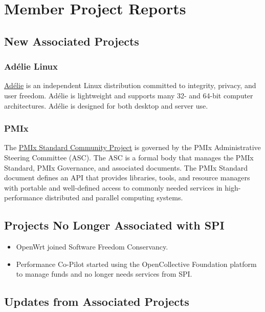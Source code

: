 \documentclass[a4paper]{report}
\begin{document}
\chapter{Member Project Reports}

\section{New Associated Projects}

\subsection{Adélie Linux}

\href{https://www.adelielinux.org/}{Adélie} is an independent Linux distribution committed to integrity, privacy, and user freedom.  Adélie is lightweight and supports many 32- and 64-bit computer architectures. Adélie is designed for both desktop and server use.

\subsection{PMIx}

The \href{https://pmix.org/}{PMIx Standard Community Project} is governed by the PMIx Administrative Steering Committee (ASC). The ASC is a formal body that manages the PMIx Standard, PMIx Governance, and associated documents. The PMIx Standard document defines an API that provides libraries, tools, and resource managers with portable and well-defined access to commonly needed services in high-performance distributed and parallel computing systems.

\section{Projects No Longer Associated with SPI}

\begin{itemize}

\item OpenWrt joined Software Freedom Conservancy.

\item Performance Co-Pilot started using the OpenCollective Foundation platform to manage funds and no longer needs services from SPI.

\end{itemize}

\section{Updates from Associated Projects}
\end{document}
